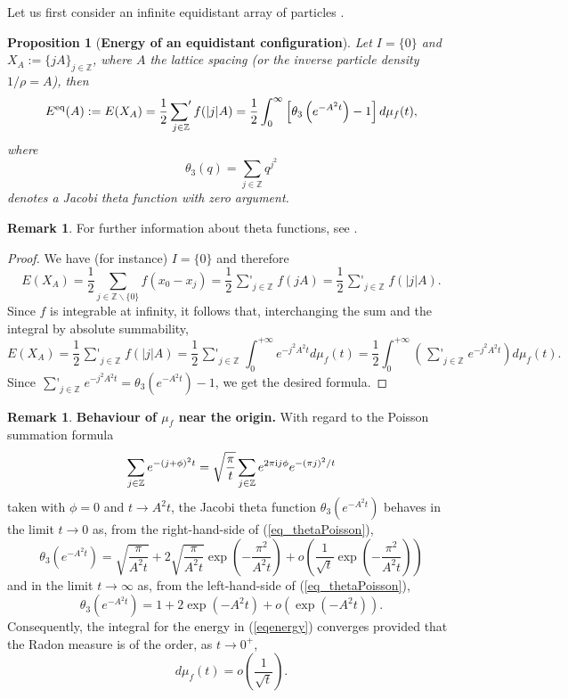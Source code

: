 \documentclass[12pt]{iopart}
\def\xsum{\mathop{\sum\nolimits'}}
\newtheorem{prop}[thm]{Proposition}
\theoremstyle{definition}
\newtheorem{remark}[thm]{Remark}
\newcommand{\Z}{\mathbb Z}
\begin{document}
Let us first consider an infinite equidistant array of particles .
\begin{prop}[\textbf{Energy of an equidistant configuration}]
Let $I=\{0\}$ and  $X_A:=\{j A\}_{j\in \Z}$, where $A$ the lattice spacing (or the inverse
particle density $1/\rho=A$), then
\begin{equation} \label{eqenergy}
E^{\rm eq}(A) :=E(X_A)= \frac{1}{2} \xsum_{j\in \Z} f(\vert j\vert A) 
= \frac{1}{2} \int_0^{\infty} \left[ \theta_3\left( e^{-A^2 t}\right) - 1\right]
d\mu_f(t) ,
\end{equation}
where
\begin{equation}
\theta_3(q) = \sum_{j\in \Z} q^{j^2}
\end{equation}
denotes a Jacobi theta function with zero argument.
\end{prop}
\begin{remark}
For further information about theta functions, see \cite{Gradshteyn}.
\end{remark}
\begin{proof}
We have (for instance) $I=\{0\}$ and therefore
$$
E(X_A)=\frac{1}{2} \sum_{j\in \Z\backslash \{0\}} f(x_0-x_j)
=\frac{1}{2} \xsum_{j\in \Z} f( j A) =\frac{1}{2} \xsum_{j\in \Z} f(\vert j\vert A).
$$
Since $f$ is integrable at infinity, it follows that, interchanging the sum and the integral by absolute summability, 
$$
E(X_A)=\frac{1}{2} \xsum_{j\in \Z} f(\vert j\vert A)=\frac{1}{2} \xsum_{j\in\Z}
\int_0^{+\infty} e^{-j^2 A^2 t} d\mu_f(t)=\frac{1}{2}
\int_0^{+\infty} \left(\xsum_{j\in \Z} e^{-j^2 A^2 t}\right) d\mu_f(t).
$$
Since
$\displaystyle\xsum_{j\in \Z} e^{-j^2 A^2 t}=\theta_3\left( e^{-A^2 t}\right)-1$,
we get the desired formula.
\end{proof}
\begin{remark}{\textbf{Behaviour of $\mu_f$ near the origin.}}
With regard to the Poisson summation formula \cite{Stein71}
\begin{equation}\label{eq_thetaPoisson}
\sum_{j\in \Z} e^{-(j+\phi)^2t} = \sqrt{\frac{\pi}{t}}
\sum_{j\in \Z} e^{2\pi{\rm i}j\phi} e^{-(\pi j)^2/t}
\end{equation}
taken with $\phi=0$ and $t\to A^2 t$, the Jacobi theta function
$\theta_3\left( e^{-A^2 t}\right)$ behaves in the limit $t\to 0$ as, from the right-hand-side of (\ref{eq_thetaPoisson}),
\begin{equation}
\theta_3\left( e^{-A^2 t}\right) =
\sqrt{\frac{\pi}{A^2 t}} + 2\sqrt{\frac{\pi}{A^2 t}}
\exp\left( - \frac{\pi^2}{A^2 t} \right) + o\left( \frac{1}{\sqrt{t}}
\exp\left( - \frac{\pi^2}{A^2 t} \right)\right)
\end{equation}
and in the limit $t\to \infty$ as, from the left-hand-side of (\ref{eq_thetaPoisson}),
\begin{equation}
\theta_3\left( e^{-A^2 t}\right) =
1 + 2 \exp\left( - A^2 t \right) + o\left(\exp\left( - A^2 t \right) \right).
\end{equation}
Consequently, the integral for the energy in (\ref{eqenergy}) converges
provided that the Radon measure is of the order, as $t\to 0^+$,
\begin{equation}
d\mu_f(t) = o\left( \frac{1}{\sqrt{t}} \right) .
\end{equation}  
\end{remark}
\end{document}

